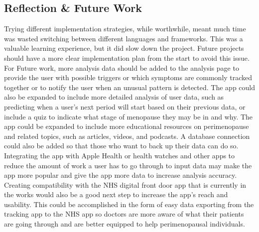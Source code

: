 \subsection{Reflection \& Future Work}
Trying different implementation strategies, while worthwhile, meant much time was wasted switching between different languages and frameworks. This was a valuable learning experience, but it did slow down the project. Future projects should have a more clear implementation plan from the start to avoid this issue. For Future work, more analysis data should be added to the analysis page to provide the user with possible triggers or which symptoms are commonly tracked together or to notify the user when an unusual pattern is detected. The app could also be expanded to include more detailed analysis of user data, such as predicting when a user's next period will start based on their previous data, or include a quiz to indicate what stage of menopause they may be in and why. The app could be expanded to include more educational resources on perimenopause and related topics, such as articles, videos, and podcasts. A database connection could also be added so that those who want to back up their data can do so. Integrating the app with Apple Health or health watches and other apps to reduce the amount of work a user has to go through to input data may make the app more popular and give the app more data to increase analysis accuracy. Creating compatibility with the NHS digital front door app that is currently in the works would also be a good next step to increase the app's reach and usability. This could be accomplished in the form of easy data exporting from the tracking app to the NHS app so doctors are more aware of what their patients are going through and are better equipped to help perimenopausal individuals.


